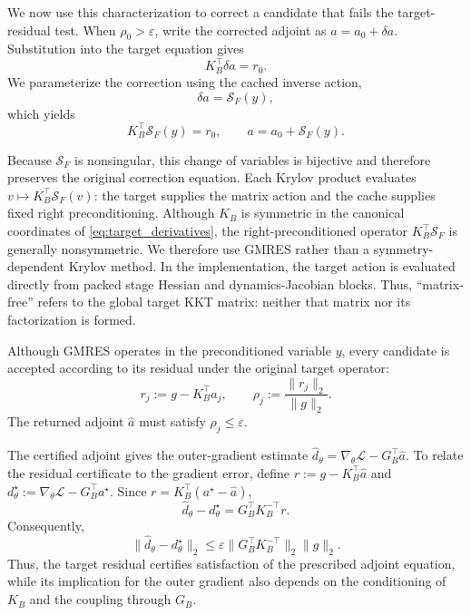 \documentclass[letterpaper,10pt,conference]{ieeeconf}
\begin{document}
We now use this characterization to correct a candidate that fails the
target-residual test. When $\rho_0>\varepsilon$, write the corrected
adjoint as $a=a_0+\delta a$. Substitution into the target equation gives
\begin{equation}
K_B^\top\delta a=r_0.
\label{eq:adjoint_correction_system}
\end{equation}
We parameterize the correction using the cached inverse action,
\begin{equation}
\delta a=\mathcal S_F(y),
\label{eq:right_preconditioned_variable}
\end{equation}
which yields
\begin{equation}
K_B^\top\mathcal S_F(y)=r_0,
\qquad
a=a_0+\mathcal S_F(y).
\label{eq:right_preconditioned_correction}
\end{equation}

Because $\mathcal S_F$ is nonsingular, this change of variables is
bijective and therefore preserves the original correction equation.
Each Krylov product evaluates
$v\mapsto K_B^\top\mathcal S_F(v)$: the target supplies the matrix
action and the cache supplies fixed right preconditioning.
Although $K_B$ is symmetric in the canonical coordinates of
\eqref{eq:target_derivatives}, the right-preconditioned operator
$K_B^\top\mathcal S_F$ is generally nonsymmetric. We therefore use GMRES \cite{saad1986gmres} rather than a
symmetry-dependent Krylov method. In the
implementation, the target action is evaluated directly from packed
stage Hessian and dynamics-Jacobian blocks. Thus, ``matrix-free'' refers
to the global target KKT matrix: neither that matrix nor its
factorization is formed.

Although GMRES operates in the preconditioned variable $y$, every
candidate is accepted according to its residual under the original
target operator:
\begin{equation}
r_j:=g-K_B^\top a_j,
\qquad
\rho_j:=\frac{\|r_j\|_2}{\|g\|_2}.
\label{eq:target_adjoint_residual}
\end{equation}
The returned adjoint $\widehat a$ must satisfy
$\rho_j\leq\varepsilon$.

The certified adjoint gives the outer-gradient estimate
$\widehat d_\theta
=\nabla_\theta\mathcal L-G_B^\top\widehat a$.
To relate the residual certificate to the gradient error, define
$r:=g-K_B^\top\widehat a$ and
$d_\theta^\star
:=\nabla_\theta\mathcal L-G_B^\top a^\star$.
Since $r=K_B^\top(a^\star-\widehat a)$,
\begin{equation}
\widehat d_\theta-d_\theta^\star
=
G_B^\top K_B^{-\top}r.
\label{eq:gradient_error_identity}
\end{equation}
Consequently,
\begin{equation}
\|\widehat d_\theta-d_\theta^\star\|_2
\leq
\varepsilon
\|G_B^\top K_B^{-\top}\|_2
\|g\|_2.
\label{eq:certified_gradient_error_bound}
\end{equation}
Thus, the target residual certifies satisfaction of the prescribed
adjoint equation, while its implication for the outer gradient also
depends on the conditioning of $K_B$ and the coupling through $G_B$.
\end{document}
